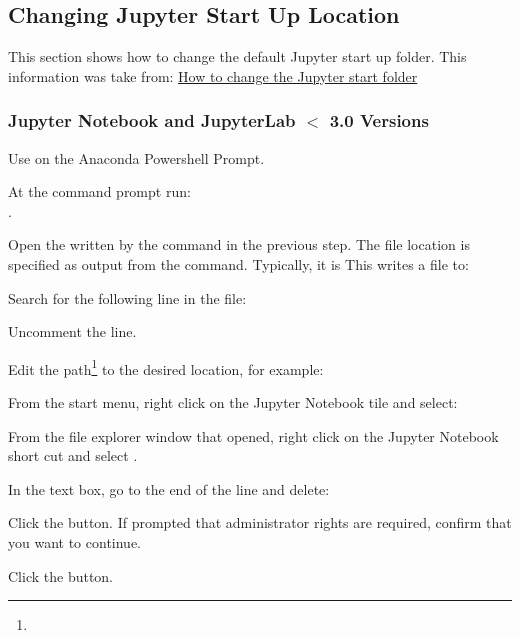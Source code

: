 	\subsection{Changing Jupyter Start Up Location}
This section shows how to change the default Jupyter start up folder.  This information was take from:
\href{https://stackoverflow.com/questions/35254852/how-to-change-the-jupyter-start-up-folder}{How to change the Jupyter start folder}

	\subsubsection{Jupyter Notebook and JupyterLab \texorpdfstring{$<$}{<} 3.0 Versions}
	\begin{numberedlist}
		\item Use  on the Anaconda Powershell Prompt.
		\item At the command prompt run:\\ . \label{nl:jupyterstartupfoldergenerateconfiguration}
		\item Open the written by the command in the previous step.  The file location is specified as output from the command.  Typically, it is This writes a file to:\\  \label{nl:jupyterstartupfolderconfigurationfile}
		\item Search for the following line in the file:\\  \label{nl:jupyterstartupfoldersearchforline}
		\item Uncomment the line.
		\item Edit the path\footnote{} to the desired location, for example:\\   \label{nl:jupyterstartupfoldereditpath}
		\item From the start menu, right click on the Jupyter Notebook tile and select:\\ 
		\item From the file explorer window that opened, right click on the Jupyter Notebook short cut and select .
		\item In the  text box, go to the end of the line and delete:\\ 
		\item Click the  button.  If prompted that administrator rights are required, confirm that you want to continue.
		\item Click the  button.
	\end{numberedlist}

